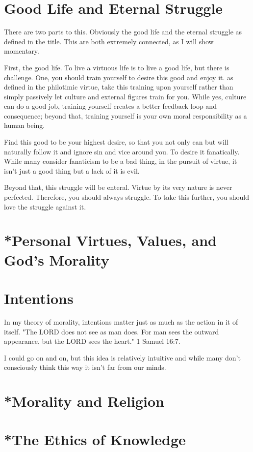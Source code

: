 \section{Good Life and Eternal Struggle}
\par There are two parts to this. Obviously the good life and the eternal struggle as defined in the title. This are both extremely connected, as I will show momentary.
\par First, the good life. To live a virtuous life is to live a good life, but there is challenge. One, you should train yourself to desire this good and enjoy it. as defined in the philotimic virtue, take this training upon yourself rather than simply passively let culture and external figures train for you. While yes, culture can do a good job, training yourself creates a better feedback loop and consequence; beyond that, training yourself is your own moral responsibility as a human being.
\par Find this good to be your highest desire, so that you not only can but will naturally follow it and ignore sin and vice around you. To desire it fanatically. While many consider fanaticism to be a bad thing, in the pursuit of virtue, it isn't just a good thing but a lack of it is evil.
\par Beyond that, this struggle will be enteral. Virtue by its very nature is never perfected. Therefore, you should always struggle. To take this further, you should love the struggle against it.
\section{*Personal Virtues, Values, and God's Morality}

\section{Intentions}
\par In my theory of morality, intentions matter just as much as the action in it of itself. "The LORD does not see as man does. For man sees the outward appearance, but the LORD sees the heart." 1 Samuel 16:7.
\par I could go on and on, but this idea is relatively intuitive and while many don't consciously think this way it isn't far from our minds.
\section{*Morality and Religion}
\section{*The Ethics of Knowledge}

